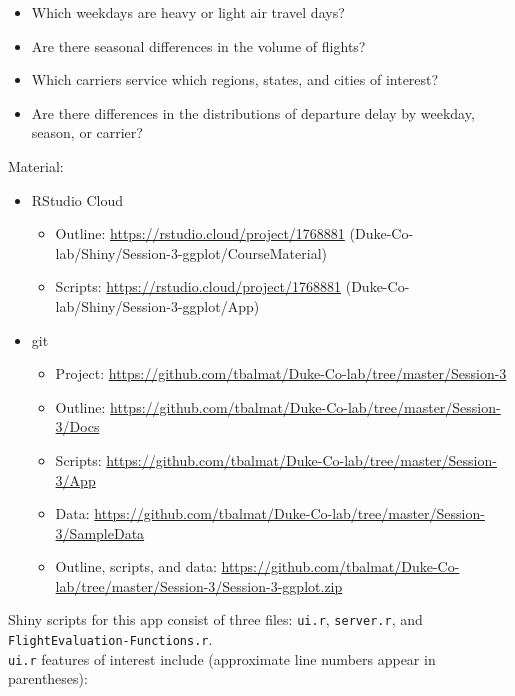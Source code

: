 \documentclass[10pt, letterpaper]{article}
\begin{document}
\begin{spacing}{1.0}
\begin{itemize}[noitemsep]
    \item Which weekdays are heavy or light air travel days?
    \item Are there seasonal differences in the volume of flights?
    \item Which carriers service which regions, states, and cities of interest?
    \item Are there differences in the distributions of departure delay by weekday, season, or carrier? 
\end{itemize}

Material:
\begin{itemize}
    \item RStudio Cloud
    \begin{itemize}[noitemsep]
        \item Outline: \url{https://rstudio.cloud/project/1768881} (Duke-Co-lab/Shiny/Session-3-ggplot/CourseMaterial)
        \item Scripts: \url{https://rstudio.cloud/project/1768881} (Duke-Co-lab/Shiny/Session-3-ggplot/App)
    \end{itemize}
    \item git
    \begin{itemize}[noitemsep]
        \item Project: \url{https://github.com/tbalmat/Duke-Co-lab/tree/master/Session-3}
        \item Outline: \url{https://github.com/tbalmat/Duke-Co-lab/tree/master/Session-3/Docs}
        \item Scripts: \url{https://github.com/tbalmat/Duke-Co-lab/tree/master/Session-3/App}
        \item Data: \url{https://github.com/tbalmat/Duke-Co-lab/tree/master/Session-3/SampleData}
        \item Outline, scripts, and data: \url{https://github.com/tbalmat/Duke-Co-lab/tree/master/Session-3/Session-3-ggplot.zip}
    \end{itemize}
\end{itemize}

Shiny scripts for this app consist of three files: \texttt{ui.r}, \texttt{server.r}, and \texttt{FlightEvaluation-Functions.r}.\\

\texttt{ui.r} features of interest include (approximate line numbers appear in parentheses):


\end{spacing}
\end{document}
